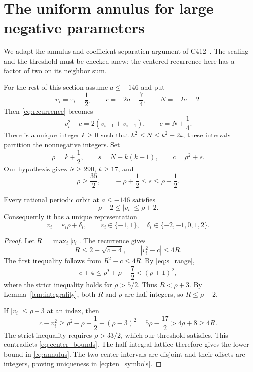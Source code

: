 \section{The uniform annulus for large negative parameters}
\label{sec:annulus}

We adapt the annulus and coefficient-separation argument of
C412~\cite[Sections 3--4]{c412}. The scaling and the threshold must
be checked anew: the centered recurrence here has a factor of two
on its neighbor sum.

For the rest of this section assume $a\le-146$ and put
\begin{equation}
 v_i=x_i+\frac12,\qquad c=-2a-\frac74,
 \qquad N=-2a-2.
 \label{eq:center}
\end{equation}
Then \eqref{eq:recurrence} becomes
\begin{equation}
 v_i^2-c=2(v_{i-1}+v_{i+1}),\qquad c=N+\frac14.
 \label{eq:center_recurrence}
\end{equation}
There is a unique integer $k\ge0$ such that
$k^2\le N\le k^2+2k$; these intervals partition the nonnegative
integers. Set
\begin{equation}
 \rho=k+\frac12,\qquad s=N-k(k+1),\qquad c=\rho^2+s.
 \label{eq:rho_s}
\end{equation}
Our hypothesis gives $N\ge290$, $k\ge17$, and
\begin{equation}
 \rho\ge\frac{35}{2},\qquad
 -\rho+\frac12\le s\le\rho-\frac12.
 \label{eq:s_range}
\end{equation}

\begin{lemma}
\label{lem:annulus}
Every rational periodic orbit at $a\le-146$ satisfies
\begin{equation}
 \rho-2\le |v_i|\le\rho+2.
 \label{eq:annulus}
\end{equation}
Consequently it has a unique representation
\begin{equation}
 v_i=\varepsilon_i\rho+\delta_i,
 \qquad \varepsilon_i\in\{-1,1\},\quad
 \delta_i\in\{-2,-1,0,1,2\}.
 \label{eq:ten_symbols}
\end{equation}
\end{lemma}
\begin{proof}
Let $R=\max_i|v_i|$. The recurrence gives
\begin{equation}
 R\le2+\sqrt{c+4},\qquad |v_i^2-c|\le4R.
 \label{eq:center_bounds}
\end{equation}
The first inequality follows from $R^2-c\le4R$.
By \eqref{eq:s_range},
\[
 c+4\le\rho^2+\rho+\frac72<(\rho+1)^2,
\]
where the strict inequality holds for $\rho>5/2$.
Thus $R<\rho+3$. By Lemma~\ref{lem:integrality}, both $R$ and
$\rho$ are half-integers, so $R\le\rho+2$.

If $|v_i|\le\rho-3$ at an index, then
\[
 c-v_i^2\ge\rho^2-\rho+\frac12-(\rho-3)^2
 =5\rho-\frac{17}{2}>4\rho+8\ge4R.
\]
The strict inequality requires $\rho>33/2$, which our threshold
satisfies. This contradicts \eqref{eq:center_bounds}.
The half-integral lattice therefore gives the lower bound in
\eqref{eq:annulus}. The two center intervals are disjoint and
their offsets are integers, proving uniqueness in
\eqref{eq:ten_symbols}.
\end{proof}

